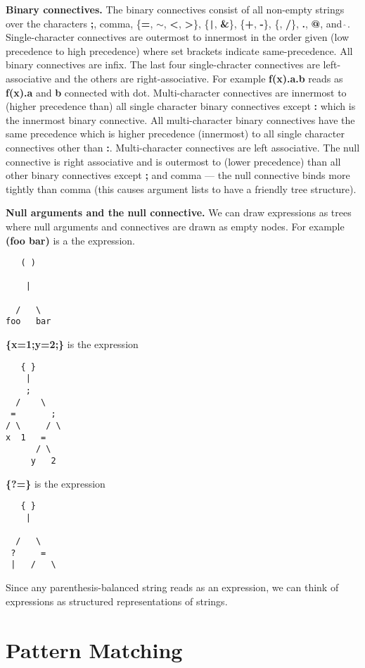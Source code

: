 \documentclass{article}
\newcommand{\mtt}[1]{\mbox{\tt #1}}
\begin{document}
{\bf Binary connectives.} The binary connectives consist of all non-empty strings over the characters {\bf ;}, comma, \{{\bf =}, {\bf $\sim$}, {\bf <}, {\bf >}\}, \{\mtt{|}, {\bf \&}\}, \{{\bf +},
{\bf -}\}, \{{\bf *}, {\bf /}\}, {\bf .}, {\bf @}, and \mtt{$\hat{~}$}.
Single-character connectives are outermost to innermost in the order given (low
precedence to high precedence) where set brackets indicate same-precedence.    All binary connectives are infix.  The last four single-chracter connectives are left-associative and the
others are right-associative. For example {\bf f(x).a.b} reads as {\bf f(x).a} and {\bf b} connected with dot.  Multi-character connectives are
innermost to (higher precedence than) all single character binary connectives except {\bf :} which is the innermost binary connective. All multi-character binary connectives have the same
precedence which is higher precedence (innermost) to all single character connectives other than {\bf :}.  Multi-character connectives are left associative.  The null connective is right associative and is outermost to (lower precedence) than all other binary connectives
except {\bf;} and comma --- the null connective binds more tightly than comma (this causes argument lists to have a friendly tree structure).

{\bf Null arguments and the null connective.}  We can draw expressions as trees where null arguments and connectives are drawn as empty nodes.
For example {\bf (foo bar)} is a the expression.
\begin{verbatim}
   ( )

    |
      
  /   \
foo   bar
\end{verbatim}
  
{\bf \{x=1;y=2;\}} is the expression
\begin{verbatim}
   { }
    |
    ;   
  /    \
 =       ;
/ \     / \
x  1   =
      / \
     y   2
\end{verbatim}
{\bf \{?=\}} is  the expression
\begin{verbatim}
   { }
    |

  /   \
 ?     =
 |   /   \
\end{verbatim}
Since any parenthesis-balanced string reads as an expression, we can think of expressions as structured representations of strings.

\section{Pattern Matching}
\end{document}
